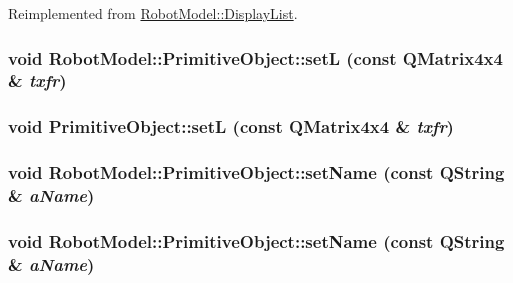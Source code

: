Reimplemented from \hyperlink{class_robot_model_1_1_display_list_a7d52ea010f54755bcb3bfae9e26dd0c2}{RobotModel::DisplayList}.\hypertarget{class_robot_model_1_1_primitive_object_a299181992bf3af3dab1a119e03b2944e}{
\subsubsection[{setL}]{\setlength{\rightskip}{0pt plus 5cm}void RobotModel::PrimitiveObject::setL (const QMatrix4x4 \& {\em txfr})}}
\label{class_robot_model_1_1_primitive_object_a299181992bf3af3dab1a119e03b2944e}
\hypertarget{class_robot_model_1_1_primitive_object_a2d5bb08b04bf39964106c981cdca7d0e}{
\subsubsection[{setL}]{\setlength{\rightskip}{0pt plus 5cm}void PrimitiveObject::setL (const QMatrix4x4 \& {\em txfr})}}
\label{class_robot_model_1_1_primitive_object_a2d5bb08b04bf39964106c981cdca7d0e}
\hypertarget{class_robot_model_1_1_primitive_object_a61c7cffdac933e1f363fa7d4715f669c}{
\subsubsection[{setName}]{\setlength{\rightskip}{0pt plus 5cm}void RobotModel::PrimitiveObject::setName (const QString \& {\em aName})}}
\label{class_robot_model_1_1_primitive_object_a61c7cffdac933e1f363fa7d4715f669c}
\hypertarget{class_robot_model_1_1_primitive_object_a61c7cffdac933e1f363fa7d4715f669c}{
\subsubsection[{setName}]{\setlength{\rightskip}{0pt plus 5cm}void RobotModel::PrimitiveObject::setName (const QString \& {\em aName})}}
